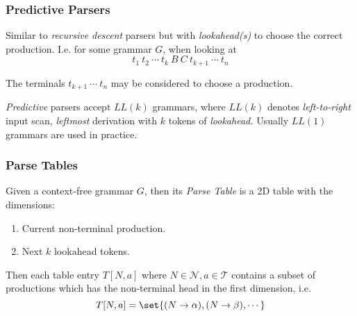 \subsubsection{Predictive Parsers}

\begin{definition}
    Similar to \textit{recursive descent} parsers but with \textit{lookahead(s)} to choose the correct production. I.e. for some grammar $G$, when looking at
    \begin{equation}
        t_1\ t_2\ \cdots\ t_k\ B\ C\ t_{k+1}\ \cdots\ t_n
    \end{equation}
    
    The terminals $t_{k+1}\ \cdots\ t_n$ may be considered to choose a production. 
\end{definition}

\begin{definition}[$LL(k)$ Grammars]
    \textit{Predictive} parsers accept $LL(k)$ grammars, where $LL(k)$ denotes \textit{left-to-right} input scan, \textit{leftmost} derivation with $k$ tokens of \textit{lookahead.} Usually $LL(1)$ grammars are used in practice.
\end{definition}

\subsubsection{Parse Tables}

\begin{definition}
    Given a context-free grammar $G$, then its \textit{Parse Table} is a 2D table with the dimensions:
    \begin{enumerate}
        \item Current non-terminal production.
        \item Next $k$ lookahead tokens.
    \end{enumerate}
    
    Then each table entry $T[N, a]$ where $N \in \mathcal{N}, a \in \mathcal{T}$ contains a subset of productions which has the non-terminal head in the first dimension, i.e.
    \begin{equation}
        T[N, a] = \set{(N \to \alpha), (N \to \beta), \cdots}
    \end{equation}
\end{definition}

